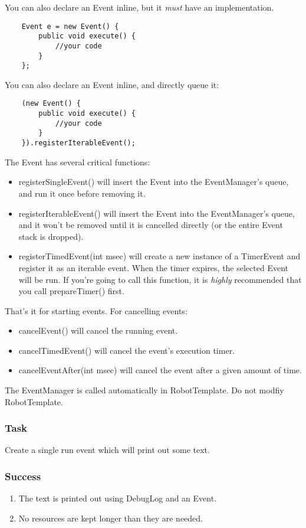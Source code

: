 \documentclass[a4paper]{article}
\begin{document}
You can also declare an Event inline, but it \textit{must} have an implementation.

\begin{verbatim}
	Event e = new Event() {
		public void execute() {
			//your code
		}
	};
\end{verbatim}

You can also declare an Event inline, and directly queue it:

\begin{verbatim}
	(new Event() {
		public void execute() {
			//your code
		}
	}).registerIterableEvent();
\end{verbatim}

The Event has several critical functions:
\begin{itemize}\item{registerSingleEvent() will insert the Event into the EventManager's queue, and run it once before removing it.}\item{registerIterableEvent() will insert the Event into the EventManager's queue, and it won't be removed until it is cancelled directly (or the entire Event stack is dropped).}\item{registerTimedEvent(int msec) will create a new instance of a TimerEvent and register it as an iterable event. When the timer expires, the selected Event will be run. If you're going to call this function, it is \textit{highly} recommended that you call prepareTimer() first.}\end{itemize}

That's it for starting events. For cancelling events: \begin{itemize}\item{cancelEvent() will cancel the running event.}\item{cancelTimedEvent() will cancel the event's execution timer.}\item{cancelEventAfter(int msec) will cancel the event after a given amount of time.}\end{itemize}

The EventManager is called automatically in RobotTemplate. Do not modfiy RobotTemplate.
\subsubsection{Task} Create a single run event which will print out some text.
\subsubsection{Success} \begin{enumerate}\item{The text is printed out using DebugLog and an Event.}\item{No resources are kept longer than they are needed.}\end{enumerate}
\end{document}
